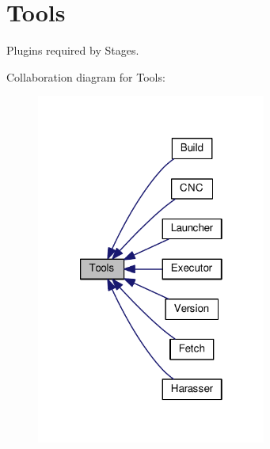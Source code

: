 \hypertarget{group__Tools}{\section{Tools}
\label{group__Tools}
}


Plugins required by Stages.  


Collaboration diagram for Tools\-:
\nopagebreak
\begin{figure}[H]
\begin{center}
\leavevmode
\includegraphics[width=214pt]{group__Tools}
\end{center}
\end{figure}
